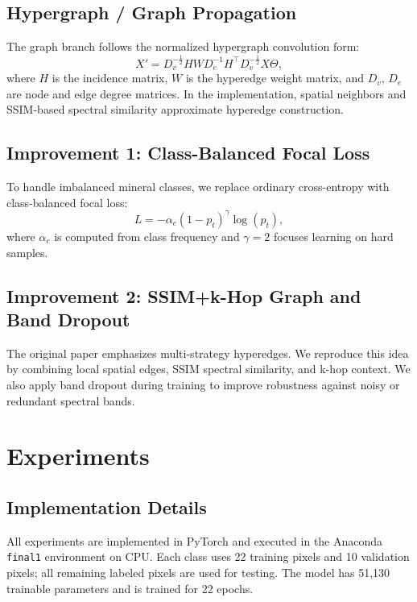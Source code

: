 \documentclass[conference]{IEEEtran}
\begin{document}
\subsection{Hypergraph / Graph Propagation}
The graph branch follows the normalized hypergraph convolution form:
\begin{equation}
    X' = D_v^{-\frac12} H W D_e^{-1} H^\top D_v^{-\frac12} X \Theta ,
    \label{eq:hypergraph}
\end{equation}
where $H$ is the incidence matrix, $W$ is the hyperedge weight matrix, and $D_v$, $D_e$ are node and edge degree matrices. In the implementation, spatial neighbors and SSIM-based spectral similarity approximate hyperedge construction.

\subsection{Improvement 1: Class-Balanced Focal Loss}
To handle imbalanced mineral classes, we replace ordinary cross-entropy with class-balanced focal loss:
\begin{equation}
    L = -\alpha_c (1-p_t)^\gamma \log(p_t),
    \label{eq:focal}
\end{equation}
where $\alpha_c$ is computed from class frequency and $\gamma=2$ focuses learning on hard samples.

\subsection{Improvement 2: SSIM+k-Hop Graph and Band Dropout}
The original paper emphasizes multi-strategy hyperedges. We reproduce this idea by combining local spatial edges, SSIM spectral similarity, and k-hop context. We also apply band dropout during training to improve robustness against noisy or redundant spectral bands.

\section{Experiments}
\subsection{Implementation Details}
All experiments are implemented in PyTorch and executed in the Anaconda \texttt{final1} environment on CPU. Each class uses 22 training pixels and 10 validation pixels; all remaining labeled pixels are used for testing. The model has 51,130 trainable parameters and is trained for 22 epochs.
\end{document}
